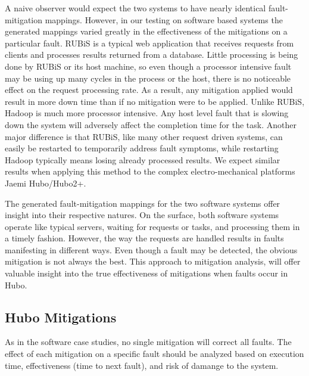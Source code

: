 A naive observer would expect the two systems to have nearly identical fault-mitigation mappings. However, in our testing on software based systems the generated mappings varied greatly in the effectiveness of the mitigations on a particular fault.  RUBiS is a typical web application that receives requests from clients and processes results returned from a database. Little processing is being done by RUBiS or its host machine, so even though a processor intensive fault may be using up many cycles in the process or the host, there is no noticeable effect on the request processing rate. As a result, any mitigation applied would result in more down time than if no mitigation were to be applied. Unlike RUBiS, Hadoop is much more processor intensive. Any host level fault that is slowing down the system will adversely affect the completion time for the task. Another major difference is that RUBiS, like many other request driven systems, can easily be restarted to temporarily address fault symptoms, while restarting Hadoop typically means losing already processed results.  We expect similar results when applying this method to the complex electro-mechanical platforms Jaemi Hubo/Hubo2+.

The generated fault-mitigation mappings for the two software systems offer insight into their respective natures. On the surface, both software systems operate like typical servers, waiting for requests or tasks, and processing them in a timely fashion. However, the way the requests are handled results in faults manifesting in different ways. Even though a fault may be detected, the obvious mitigation is not always the best. This approach to mitigation analysis, will offer valuable insight into the true effectiveness of mitigations when faults occur in Hubo.

\subsection{Hubo Mitigations}
As in the software case studies, no single mitigation will correct all faults. The effect of each mitigation on a specific fault should be analyzed based on execution time, effectiveness (time to next fault), and risk of damange to the system.







